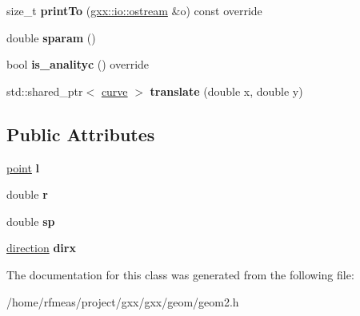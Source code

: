 \begin{DoxyCompactItemize}
\item 
size\+\_\+t {\bfseries print\+To} (\hyperlink{classgxx_1_1io_1_1ostream}{gxx\+::io\+::ostream} \&o) const override\hypertarget{classgxx_1_1geom2_1_1circle_ab1883e9a35d83218c36b32413c6fb4ac}{}\label{classgxx_1_1geom2_1_1circle_ab1883e9a35d83218c36b32413c6fb4ac}

\item 
double {\bfseries sparam} ()\hypertarget{classgxx_1_1geom2_1_1circle_a26e16cd9190f29df3dcfbbce020defc3}{}\label{classgxx_1_1geom2_1_1circle_a26e16cd9190f29df3dcfbbce020defc3}

\item 
bool {\bfseries is\+\_\+analityc} () override\hypertarget{classgxx_1_1geom2_1_1circle_aa81b4ec51dd1f61a9b7ef39a770257f0}{}\label{classgxx_1_1geom2_1_1circle_aa81b4ec51dd1f61a9b7ef39a770257f0}

\item 
std\+::shared\+\_\+ptr$<$ \hyperlink{classgxx_1_1geom2_1_1curve}{curve} $>$ {\bfseries translate} (double x, double y)\hypertarget{classgxx_1_1geom2_1_1circle_a03b81bb9b51fd768a581833442b57fda}{}\label{classgxx_1_1geom2_1_1circle_a03b81bb9b51fd768a581833442b57fda}

\end{DoxyCompactItemize}
\subsection*{Public Attributes}
\begin{DoxyCompactItemize}
\item 
\hyperlink{classmalgo_1_1vector2}{point} {\bfseries l}\hypertarget{classgxx_1_1geom2_1_1circle_a5f4ba09d4f8981de8a5209d0973d18f8}{}\label{classgxx_1_1geom2_1_1circle_a5f4ba09d4f8981de8a5209d0973d18f8}

\item 
double {\bfseries r}\hypertarget{classgxx_1_1geom2_1_1circle_a38247ff2ad6189df86efd599bc954898}{}\label{classgxx_1_1geom2_1_1circle_a38247ff2ad6189df86efd599bc954898}

\item 
double {\bfseries sp}\hypertarget{classgxx_1_1geom2_1_1circle_a0e1c9475ab3dc37c916ba2af119b4da8}{}\label{classgxx_1_1geom2_1_1circle_a0e1c9475ab3dc37c916ba2af119b4da8}

\item 
\hyperlink{classmalgo_1_1unit__vector2}{direction} {\bfseries dirx}\hypertarget{classgxx_1_1geom2_1_1circle_a8faa950866fa901990f179bfb4544b3f}{}\label{classgxx_1_1geom2_1_1circle_a8faa950866fa901990f179bfb4544b3f}

\end{DoxyCompactItemize}


The documentation for this class was generated from the following file\+:\begin{DoxyCompactItemize}
\item 
/home/rfmeas/project/gxx/gxx/geom/geom2.\+h\end{DoxyCompactItemize}
